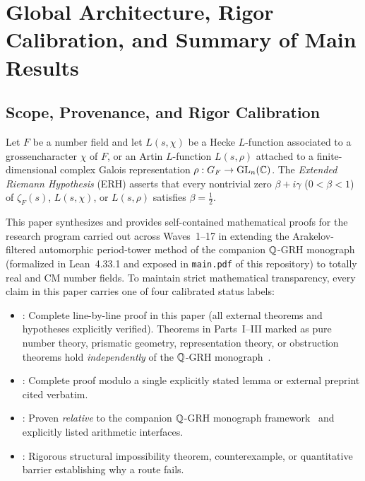 \section{Global Architecture, Rigor Calibration, and Summary of Main Results}\label{sec:1:arch}

\subsection{Scope, Provenance, and Rigor Calibration}\label{sec:1:rigor}

Let $F$ be a number field and let $L(s, \chi)$ be a Hecke $L$-function associated to a grossencharacter $\chi$ of $F$, or an Artin $L$-function $L(s, \rho)$ attached to a finite-dimensional complex Galois representation $\rho : G_F \to \mathrm{GL}_n(\mathbb{C})$. The \emph{Extended Riemann Hypothesis} (ERH) asserts that every nontrivial zero $\beta + i\gamma$ ($0 < \beta < 1$) of $\zeta_F(s)$, $L(s, \chi)$, or $L(s, \rho)$ satisfies $\beta = \frac{1}{2}$.

This paper synthesizes and provides self-contained mathematical proofs for the research program carried out across Waves~1--17 in extending the Arakelov-filtered automorphic period-tower method of the companion $\mathbb{Q}$-GRH monograph~\cite{Alpoge2026,GRH178} (formalized in Lean~4.33.1 and exposed in \texttt{main.pdf} of this repository) to totally real and CM number fields. To maintain strict mathematical transparency, every claim in this paper carries one of four calibrated status labels:
\begin{itemize}
\item \tagProved: Complete line-by-line proof in this paper (all external theorems and hypotheses explicitly verified). Theorems in Parts~I--III marked \tagProved{} as pure number theory, prismatic geometry, representation theory, or obstruction theorems hold \emph{independently} of the $\mathbb{Q}$-GRH monograph~\cite{Alpoge2026}.
\item \tagMod: Complete proof modulo a single explicitly stated lemma or external preprint cited verbatim.
\item \tagCond: Proven \emph{relative} to the companion $\mathbb{Q}$-GRH monograph framework~\cite{Alpoge2026,GRH178} and explicitly listed arithmetic interfaces.
\item \tagObs: Rigorous structural impossibility theorem, counterexample, or quantitative barrier establishing why a route fails.
\end{itemize}

